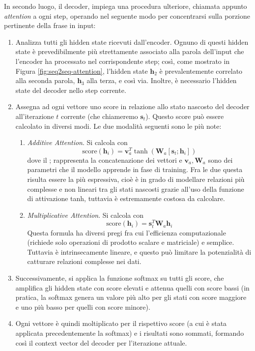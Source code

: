 \documentclass[12pt,a4paper,twoside,openright]{book}
\begin{document}
In secondo luogo, il decoder, impiega una procedura ulteriore, chiamata appunto \emph{attention} a ogni step, operando nel seguente modo per concentrarsi sulla porzione pertinente della frase in input:
\begin{enumerate}
\item Analizza tutti gli hidden state ricevuti dall'encoder. Ognuno di questi hidden state è prevedibilmente più strettamente associato alla parola dell'input che l'encoder ha processato nel corrispondente step; così, come mostrato in Figura \ref{fig:seq2seq-attention}, l'hidden state $\mathbf{h}_2$ è prevalentemente correlato alla seconda parola, $\mathbf{h}_3$ alla terza, e così via. Inoltre, è necessario l'hidden state del decoder nello step corrente.
    \item Assegna ad ogni vettore uno score in relazione allo stato nascosto del decoder all'iterazione $t$ corrente (che chiameremo $\mathbf{s}_t$). Questo score può essere calcolato in diversi modi. Le due modalità seguenti sono le più note:
    \begin{enumerate}
        \item \emph{Additive Attention}. Si calcola con 
        \begin{equation*}
            \text{score}(\mathbf{h}_i) = \mathbf{v}_a^T \tanh{\left(\mathbf{W}_a [ \mathbf{s}_t;\mathbf{h}_i ]\right)}
        \end{equation*}
        dove il ; rappresenta la concatenazione dei vettori e $\mathbf{v}_a, \mathbf{W}_a$ sono dei parametri che il modello apprende in fase di training.
        Fra le due questa risulta essere la più espressiva, cioè è in grado di modellare relazioni più complesse e non lineari tra gli stati nascosti grazie all'uso della funzione di attivazione tanh, tuttavia è estremamente costosa da calcolare.
        \item \emph{Multiplicative Attention}. Si calcola con
        \begin{equation*}
            \text{score}(\mathbf{h}_i) = \mathbf{s}_t^T \mathbf{W}_a \mathbf{h}_i
        \end{equation*}
        Questa formula ha diversi pregi fra cui l'efficienza computazionale (richiede solo operazioni di prodotto scalare e matriciale) e semplice. Tuttavia è intrinsecamente lineare, e questo può limitare la potenzialità di catturare relazioni complesse nei dati.
    \end{enumerate}
    \item Successivamente, si applica la funzione softmax su tutti gli score, che amplifica gli hidden state con score elevati e attenua quelli con score bassi (in pratica, la softmax genera un valore più alto per gli stati con score maggiore e uno più basso per quelli con score minore). 

    \item Ogni vettore è quindi moltiplicato per il rispettivo score (a cui è stata applicata precedentemente la softmax) e i risultati sono sommati, formando così il context vector del decoder per l'iterazione attuale.
\end{enumerate}
\end{document}
